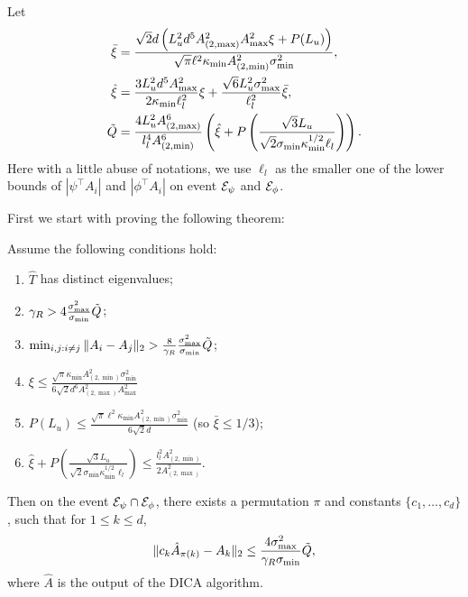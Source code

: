 Let 
\begin{align*}
\bar{\xi} &=   \frac{\sqrt{2}d\left(L_u^2d^5 A_{(2,\max)}^2A_{\max}^2\xi + P(L_u)\right)}{\sqrt{\pi}\ell^2\kappa_{\min}A^2_{(2,\min)}\sigma_{\min}^2}, \\
\hat{\xi} &= \frac{3L_u^2d^5A^2_{\max}}{2\kappa_{\min}\ell_l^2}\xi + \frac{\sqrt{6}L_u^2\sigma_{\max}^2}{\ell_l^2}\bar{\xi}, \\
 \tilde{Q} &=  
 \frac{4L_u^2A^6_{(2,\max)}}{l_l^4 A^6_{(2,\min)}}\left(\hat{\xi}
 +
 P\left(\frac{\sqrt{3}L_u}{\sqrt{2}\sigma_{\min}\kappa_{\min}^{1/2}\ell_l}\right)\right).
\end{align*} 
Here with a little abuse of notations, we use $\ell_l$ as the smaller one of the lower bounds of $|\psi^{\top}A_i|$ and $|\phi^{\top}A_i|$ on event $\mathcal{E}_{\psi}$ and $\mathcal{E}_{\phi}$.

First we start with proving the following theorem:
\begin{theorem}
\label{thm:Modefficiency}
 Assume the following conditions hold:
 \begin{enumerate}
 \item $\hat{T}$ has distinct eigenvalues;
 \item $\gamma_R > 4 \frac{\sigma_{\max}^2}{\sigma_{\min}}\tilde{Q}$; 
 \item $\min_{i,j:i\neq j} \|A_i - A_j\|_2 > \frac{8}{\gamma_R}\frac{\sigma_{\max}^2}{\sigma_{\min}} \tilde{Q}$;
 \item $\xi \le \frac{\sqrt{\pi}\kappa_{\min}A^2_{(2,\min)}\sigma_{\min}^2}{6\sqrt{2}d^6A_{(2,\max)}^2A_{\max}^2}$
 \item $P(L_u) \le \frac{\sqrt{\pi}\ell^2\kappa_{\min}A^2_{(2,\min)}\sigma_{\min}^2}{6\sqrt{2}d}$
 (so $\bar{\xi} \le 1/3$);
 \item $\hat{\xi}
  +
  P\left(\frac{\sqrt{3}L_u}{\sqrt{2}\sigma_{\min}\kappa_{\min}^{1/2}\ell_l}\right) \le \frac{l_l^2 A^2_{(2,\min)}}{2A^2_{(2,\max)}}$.
 \end{enumerate}
Then on the event $\mathcal{E}_{\psi} \cap\mathcal{E}_{\phi}$, there exists a permutation $\pi$ and constants $\{c_1,\ldots,c_d\}$, such that for $1\le k\le d$,
\[
\| c_k\hat{A}_{\pi(k)} - A_k\|_2 \le \frac{4\sigma^2_{\max}}{\gamma_R\sigma_{\min}} \tilde{Q},
\]
where $\hat{A}$ is the output of the DICA algorithm.
\end{theorem}

